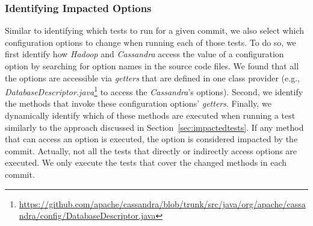 

\subsubsection{Identifying Impacted Options}%
Similar to identifying which tests to run for a given commit, we also select which configuration options to change when running each of those tests. To do so, we first identify how \emph{Hadoop} and \emph{Cassandra} access the value of a configuration option by searching for option names in the source code files. We found that all the options are accessible via \emph{getters} that are defined in one class provider (e.g., \emph{DatabaseDescriptor.java}\footnote{\url{https://github.com/apache/cassandra/blob/trunk/src/java/org/apache/cassandra/config/DatabaseDescriptor.java}} to access the \emph{Cassandra}'s options). Second, we identify the methods that invoke these configuration options' \emph{getters}. Finally, we dynamically identify which of these methods are executed when running a test similarly to the approach discussed in Section~\ref{sec:impactedtests}. If any method that can access an option is executed, the option is considered impacted by the commit. Actually, not all the tests that directly or indirectly access options are executed. We only execute the tests that cover the changed methods in each commit.

